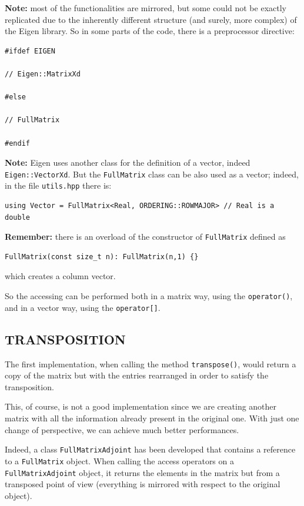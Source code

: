 \documentclass{article}
\begin{document}
\textbf{Note:} most of the functionalities are mirrored, but some could not be exactly replicated due to the inherently different structure (and surely, more complex) of the Eigen library. So in some parts of the code, there is a preprocessor directive:

\begin{verbatim}
#ifdef EIGEN

// Eigen::MatrixXd

#else 

// FullMatrix

#endif
\end{verbatim}

\textbf{Note:} Eigen uses another class for the definition of a vector, indeed \texttt{Eigen::VectorXd}. But the \texttt{FullMatrix} class can be also used as a vector; indeed, in the file \texttt{utils.hpp} there is:

\begin{verbatim}
using Vector = FullMatrix<Real, ORDERING::ROWMAJOR> // Real is a double
\end{verbatim}

\textbf{Remember:} there is an overload of the constructor of \texttt{FullMatrix} defined as

\begin{verbatim}
FullMatrix(const size_t n): FullMatrix(n,1) {}
\end{verbatim}

which creates a column vector.

So the accessing can be performed both in a matrix way, using the \texttt{operator()}, and in a vector way, using the \texttt{operator[]}.


\subsection{TRANSPOSITION}

The first implementation, when calling the method \texttt{transpose()}, would return a copy of the matrix but with the entries rearranged in order to satisfy the transposition.

This, of course, is not a good implementation since we are creating another matrix with all the information already present in the original one. With just one change of perspective, we can achieve much better performances.

Indeed, a class \texttt{FullMatrixAdjoint} has been developed that contains a reference to a \texttt{FullMatrix} object. When calling the access operators on a \texttt{FullMatrixAdjoint} object, it returns the elements in the matrix but from a transposed point of view (everything is mirrored with respect to the original object).
\end{document}
